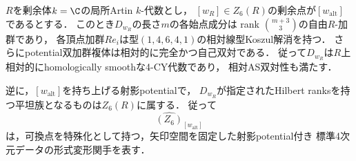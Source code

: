 \begin{theorem}[rank条件による可換点の形式模型]
\label{thm:p3-formal-rank-six}
$R$を剰余体$k=\C$の局所Artin $k$-代数とし，
$[w_R]\in Z_6(R)$の剰余点が$[w_{\mathrm{alt}}]$であるとする．
このとき$D_{w_R}$の長さ$m$の各始点成分は
rank $\binom{m+3}{3}$の自由$R$-加群であり，
各頂点加群$R e_i$は型$(1,4,6,4,1)$の相対線型Koszul解消を持つ．
さらにpotential双加群複体は相対的に完全かつ自己双対である．
従って$D_{w_R}$は$R$上相対的にhomologically smoothな4-CY代数であり，
相対AS双対性も満たす．

逆に，$[w_{\mathrm{alt}}]$を持ち上げる射影potentialで，
$D_{w_R}$が指定されたHilbert ranksを持つ平坦族となるものは$Z_6(R)$に属する．
従って
\[
 \widehat{(Z_6)}_{[w_{\mathrm{alt}}]}
\]
は，可換点を特殊化として持つ，矢印空間を固定した射影potential付き
標準4次元データの形式変形関手を表す．
\end{theorem}
